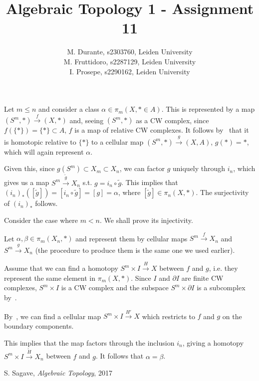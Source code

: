 \documentclass{article}
\newcommand{\I}{\mathbb{I}}
\newcommand{\exercise}[1]{\noindent {\bf Exercise #1}}
\begin{document}
\title{Algebraic Topology 1 - Assignment 11}

\author{M. Durante, s2303760, Leiden University\\M. Fruttidoro, s2287129, Leiden University\\I. Prosepe, s2290162, Leiden University}

\maketitle


\exercise{12.1}

Let $m\leq n$ and consider a class $\alpha\in\pi_m(X,*\in A)$. This is represented by a map $(S^m,*)\xrightarrow{f} (X,*)$ and, seeing $(S^m,*)$ as a CW complex, since $f(\{*\})=\{*\}\subset A$, $f$ is a map of relative CW complexes. It follows by~\cite[thm. 12.1]{sag} that it is homotopic relative to $\{*\}$ to a cellular map $(S^m,*)\xrightarrow{g} (X,A)$, $g(*)=*$, which will again represent $\alpha$.

Given this, since $g(S^m)\subset X_m\subset X_n$, we can factor $g$ uniquely through $i_n$, which gives us a map $S^m\xrightarrow{\tilde{g}} X_n$ s.t. $g=i_n\circ\tilde{g}$. This implies that $(i_n)_*([\tilde{g}])=[i_n\circ\tilde{g}]=[g]=\alpha$, where $[\tilde{g}]\in\pi_n(X,*)$. The surjectivity of $(i_n)_*$ follows.

Consider the case where $m<n$. We shall prove its injectivity.

Let $\alpha,\beta\in\pi_m(X_n,*)$ and represent them by cellular maps $S^m\xrightarrow{f} X_n$ and $S^m\xrightarrow{g} X_n$ (the procedure to produce them is the same one we used earlier).

Assume that we can find a homotopy $S^m\times I\xrightarrow{H} X$ between $f$ and $g$, i.e. they represent the same element in $\pi_m(X,*)$. Since $I$ and $\partial I$ are finite CW complexes, $S^m\times I$ is a CW complex and the subspace $S^m\times\partial I$ is a subcomplex by~\cite[cor. 12.9]{sag}.

By~\cite[thm. 12.1]{sag}, we can find a cellular map $S^m\times I\xrightarrow{H'} X$ which restricts to $f$ and $g$ on the boundary components.

This implies that the map factors through the inclusion $i_n$, giving a homotopy $S^m\times I\xrightarrow{\tilde{H}} X_n$ between $f$ and $g$. It follows that $\alpha=\beta$.

\begin{thebibliography}{9}
    S. Sagave,
    \textit{Algebraic Topology},
    2017
\end{thebibliography}
\end{document}
